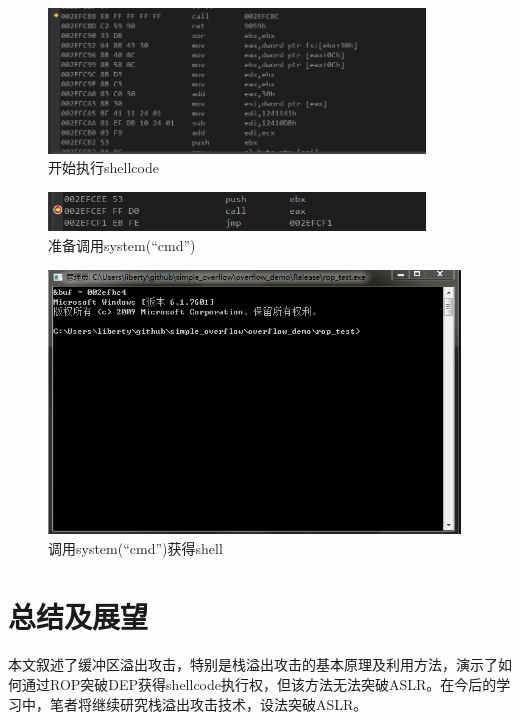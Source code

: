 \documentclass[bachelor]{thesis-uestc}
\begin{document}
\begin{figure}[htbp]
	\centering\includegraphics[width=10cm]{images/debug4.png}
	\caption{开始执行shellcode}
	\label{fig:debug4}
\end{figure}

\begin{figure}[htbp]
	\centering\includegraphics[width=10cm]{images/debug5.png}
	\caption{准备调用system(``cmd'')}
	\label{fig:debug5}
\end{figure}

\begin{figure}[htbp]
	\centering\includegraphics[height=7cm]{images/debug6.png}
	\caption{调用system(``cmd'')获得shell}
	\label{fig:debug6}
\end{figure}

\chapter{总结及展望}
本文叙述了缓冲区溢出攻击，特别是栈溢出攻击的基本原理及利用方法，演示了如何通过ROP突破DEP获得shellcode执行权，但该方法无法突破ASLR。在今后的学习中，笔者将继续研究栈溢出攻击技术，设法突破ASLR。
\end{document}
